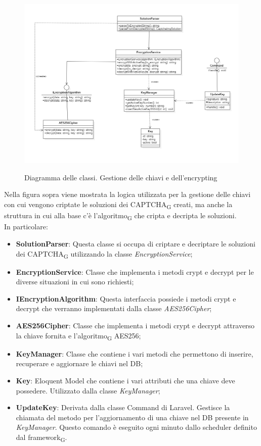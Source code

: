 \newpage


\begin{figure}[H]
	\centering
	\includegraphics[scale = 0.55]{img/key_manager.png}\\
	\caption{Diagramma delle classi. Gestione delle chiavi e dell'encrypting}
\end{figure}

Nella figura sopra viene mostrata la logica utilizzata per la gestione delle chiavi con cui vengono criptate le soluzioni dei CAPTCHA\textsubscript{G} creati, ma anche la struttura in cui alla base c'è l'algoritmo\textsubscript{G} che cripta e decripta le soluzioni.\\
In particolare:
\begin{itemize}
	\item \textbf{SolutionParser}: Questa classe si occupa di criptare e decriptare le soluzioni dei CAPTCHA\textsubscript{G} utilizzando la classe \textit{EncryptionService};
	\item \textbf{EncryptionService}: Classe che implementa i metodi crypt e decrypt per le diverse situazioni in cui sono richiesti;
	\item \textbf{IEncryptionAlgorithm}: Questa interfaccia possiede i metodi crypt e decrypt che verranno implementati dalla classe \textit{AES256Cipher};
	\item \textbf{AES256Cipher}: Classe che implementa i metodi crypt e decrypt attraverso la chiave fornita e l'algoritmo\textsubscript{G} AES256;
	\item \textbf{KeyManager}: Classe che contiene i vari metodi che permettono di inserire, recuperare e aggiornare le chiavi nel DB;
	\item \textbf{Key}: Eloquent Model che contiene i vari attributi che una chiave deve possedere. Utilizzato dalla classe \textit{KeyManager};
	\item \textbf{UpdateKey}: Derivata dalla classe Command di Laravel. Gestisce la chiamata del metodo per l'aggiornamento di una chiave nel DB presente in \textit{KeyManager}. Questo comando è eseguito ogni minuto dallo scheduler definito dal framework\textsubscript{G}.
\end{itemize}

